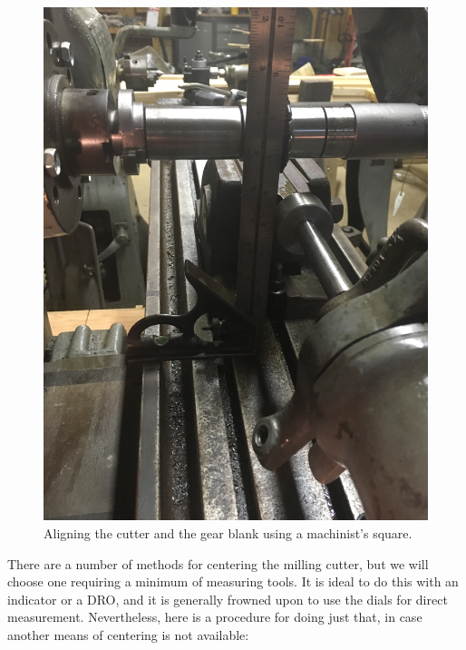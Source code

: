\documentclass[12pt,twoside,letterpaper]{article}
\begin{document}
\begin{figure}[H]
\centering
\includegraphics[width=5in]{blankAlign}
	\caption{Aligning the cutter and the gear blank using a machinist's square.}
	\label{fig:cutterAlign}
\end{figure}


	There are a number of methods for centering the milling cutter, but we will choose one requiring a minimum of measuring tools. It is ideal to do this with an indicator or a DRO, and it is generally frowned upon to use the dials for direct measurement. Nevertheless, here is a procedure for doing just that, in case another means of centering is not available:
\end{document}
